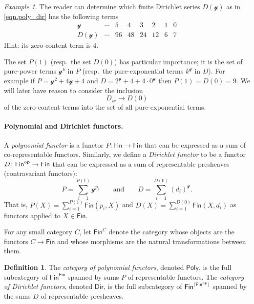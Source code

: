 \documentclass[11pt, article, one side]{memoir}
\theoremstyle{theorem}
\theoremstyle{definition}
\newtheorem{definition}[equation]{Definition}
\theoremstyle{remark}
\newtheorem{example}[equation]{Example}
\newcommand{\Cat}[1]{\mathsf{#1}}%
\newcommand{\op}{^\tn{op}}
\newcommand{\tn}[1]{\textnormal{#1}}
\newcommand{\finset}{\Cat{Fin}}
\newcommand{\zero}[1]{#1_\text{zc}}
\newcommand{\yon}{\mathcal{y}}
\newcommand{\poly}{\Cat{Poly}}
\newcommand{\dir}{\Cat{Dir}}
\newcommand{\mdot}{{\cdot}}
\newcommand{\qqand}{\qquad\text{and}\qquad}
\begin{document}
\begin{example}
The reader can determine which finite Dirichlet series $D(\yon)$ as in \cref{eqn.poly_dir} has the following terms
\[
\begin{array}{c|ccccccc}
\yon&
\cdots&
5&
4&
3&
2&
1&
0
\\\hline
D(\yon)&
\cdots&
96&
48&
24&
12&
6&
7
\end{array}
\]
Hint: its zero-content term is $4$.
\end{example}

The set $P(1)$ (resp.\ the set $D(0)$) has particular importance; it is the set of pure-power terms $\yon^k$ in $P$ (resp.\ the pure-exponential terms $k^\yon$ in $D$). For example if $P=\yon^2+4\yon+4$ and $D=2^\yon+4+4\mdot0^\yon$ then $P(1)=D(0)=9$. We will later have reason to consider the inclusion
\begin{equation}\label{eqn.zerocontent}
\zero{D}\to D(0)
\end{equation}
of the zero-content terms into the set of all pure-exponential terms.

\paragraph{Polynomial and Dirichlet functors.}
A \emph{polynomial functor} \cite{GambinoKock} is a functor $P\colon\finset\to\finset$ that can be expressed as a sum of co-representable functors. Similarly, we define a \emph{Dirichlet functor} to be a functor $D\colon\finset\op\to\finset$ that can be expressed as a sum of representable presheaves (contravariant functors):
\begin{equation}\label{eqn.finite_sum}
  P=\sum_{i=1}^{P(1)}\yon^{p_i}
  \qqand
  D=\sum_{i=1}^{D(0)}(d_i)^\yon.
\end{equation}
That is, $P(X)=\sum_{i=1}^{P(1)}\finset(p_i,X)$ and $D(X)=\sum_{i=1}^{D(0)}\finset(X,d_i)$ as functors applied to $X\in\finset$.

For any small category $C$, let $\finset^C$ denote the category whose objects are the functors $C\to\finset$ and whose morphisms are the natural transformations between them.

\begin{definition}\label{def.poly_dir}
The \emph{category of polynomial functors}, denoted $\poly$, is the full subcategory of $\finset^\finset$ spanned by sums $P$ of representable functors. The \emph{category of Dirichlet functors}, denoted $\dir$, is the full subcategory of $\finset^{(\finset\op)}$ spanned by the sums $D$ of representable presheaves.
\end{definition}
\end{document}
